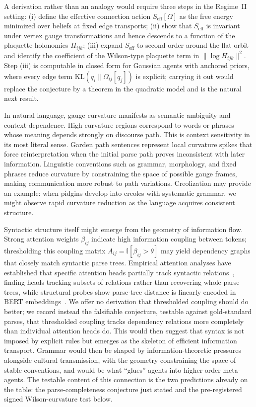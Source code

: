 \documentclass[11pt]{article}
\begin{document}
A derivation rather than an analogy would require three steps in the Regime~II setting: (i) define the effective connection action $S_{\mathrm{eff}}[\Omega]$ as the free energy minimized over beliefs at fixed edge transports; (ii) show that $S_{\mathrm{eff}}$ is invariant under vertex gauge transformations and hence descends to a function of the plaquette holonomies $H_{ijk}$; (iii) expand $S_{\mathrm{eff}}$ to second order around the flat orbit and identify the coefficient of the Wilson-type plaquette term in $\|\log H_{ijk}\|^2$. Step (iii) is computable in closed form for Gaussian agents with anchored priors, where every edge term $\mathrm{KL}(q_i \| \Omega_{ij}[q_j])$ is explicit; carrying it out would replace the conjecture by a theorem in the quadratic model and is the natural next result.

In natural language, gauge curvature manifests as semantic ambiguity and context-dependence. High curvature regions correspond to words or phrases whose meaning depends strongly on discourse path. This is context sensitivity in its most literal sense. Garden path sentences represent local curvature spikes that force reinterpretation when the initial parse path proves inconsistent with later information. Linguistic conventions such as grammar, morphology, and fixed phrases reduce curvature by constraining the space of possible gauge frames, making communication more robust to path variations. Creolization may provide an example: when pidgins develop into creoles with systematic grammar, we might observe rapid curvature reduction as the language acquires consistent structure.

Syntactic structure itself might emerge from the geometry of information flow. Strong attention weights $\beta_{ij}$ indicate high information coupling between tokens; thresholding this coupling matrix $A_{ij} = \mathbb{I}[\beta_{ij} > \theta]$ may yield dependency graphs that closely match syntactic parse trees. Empirical attention analyses have established that specific attention heads partially track syntactic relations~\cite{Clark2019, Voita2019}, finding heads tracking subsets of relations rather than recovering whole parse trees, while structural probes show parse-tree distance is linearly encoded in BERT embeddings~\cite{Hewitt2019}. We offer no derivation that thresholded coupling should do better; we record instead the falsifiable conjecture, testable against gold-standard parses, that thresholded coupling tracks dependency relations more completely than individual attention heads do. This would then suggest that syntax is not imposed by explicit rules but emerges as the skeleton of efficient information transport. Grammar would then be shaped by information-theoretic pressures alongside cultural transmission, with the geometry constraining the space of stable conventions, and would be what ``glues'' agents into higher-order meta-agents. The testable content of this connection is the two predictions already on the table: the parse-completeness conjecture just stated and the pre-registered signed Wilson-curvature test below.
\end{document}
